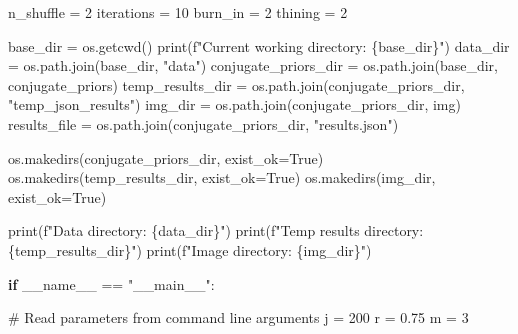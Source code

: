 \documentclass[
  letterpaper,
  DIV=11,
  numbers=noendperiod]{scrreprt}
\newenvironment{Shaded}{\begin{snugshade}}{\end{snugshade}}
\newcommand{\BuiltInTok}[1]{\textcolor[rgb]{0.00,0.23,0.31}{#1}}
\newcommand{\CommentTok}[1]{\textcolor[rgb]{0.37,0.37,0.37}{#1}}
\newcommand{\ControlFlowTok}[1]{\textcolor[rgb]{0.00,0.23,0.31}{\textbf{#1}}}
\newcommand{\DecValTok}[1]{\textcolor[rgb]{0.68,0.00,0.00}{#1}}
\newcommand{\FloatTok}[1]{\textcolor[rgb]{0.68,0.00,0.00}{#1}}
\newcommand{\NormalTok}[1]{\textcolor[rgb]{0.00,0.23,0.31}{#1}}
\newcommand{\OperatorTok}[1]{\textcolor[rgb]{0.37,0.37,0.37}{#1}}
\newcommand{\SpecialCharTok}[1]{\textcolor[rgb]{0.37,0.37,0.37}{#1}}
\newcommand{\SpecialStringTok}[1]{\textcolor[rgb]{0.13,0.47,0.30}{#1}}
\newcommand{\StringTok}[1]{\textcolor[rgb]{0.13,0.47,0.30}{#1}}
\newcommand{\VariableTok}[1]{\textcolor[rgb]{0.07,0.07,0.07}{#1}}
\begin{document}
\begin{Shaded}
\begin{Highlighting}[]
\NormalTok{n\_shuffle }\OperatorTok{=} \DecValTok{2}
\NormalTok{iterations }\OperatorTok{=} \DecValTok{10}
\NormalTok{burn\_in }\OperatorTok{=} \DecValTok{2}
\NormalTok{thining }\OperatorTok{=} \DecValTok{2}

\NormalTok{base\_dir }\OperatorTok{=}\NormalTok{ os.getcwd()}
\BuiltInTok{print}\NormalTok{(}\SpecialStringTok{f"Current working directory: }\SpecialCharTok{\{}\NormalTok{base\_dir}\SpecialCharTok{\}}\SpecialStringTok{"}\NormalTok{)}
\NormalTok{data\_dir }\OperatorTok{=}\NormalTok{ os.path.join(base\_dir, }\StringTok{"data"}\NormalTok{)}
\NormalTok{conjugate\_priors\_dir }\OperatorTok{=}\NormalTok{ os.path.join(base\_dir, }\StringTok{\textquotesingle{}conjugate\_priors\textquotesingle{}}\NormalTok{)}
\NormalTok{temp\_results\_dir }\OperatorTok{=}\NormalTok{ os.path.join(conjugate\_priors\_dir, }\StringTok{"temp\_json\_results"}\NormalTok{)}
\NormalTok{img\_dir }\OperatorTok{=}\NormalTok{ os.path.join(conjugate\_priors\_dir, }\StringTok{\textquotesingle{}img\textquotesingle{}}\NormalTok{)}
\NormalTok{results\_file }\OperatorTok{=}\NormalTok{ os.path.join(conjugate\_priors\_dir, }\StringTok{"results.json"}\NormalTok{)}

\NormalTok{os.makedirs(conjugate\_priors\_dir, exist\_ok}\OperatorTok{=}\VariableTok{True}\NormalTok{)}
\NormalTok{os.makedirs(temp\_results\_dir, exist\_ok}\OperatorTok{=}\VariableTok{True}\NormalTok{)}
\NormalTok{os.makedirs(img\_dir, exist\_ok}\OperatorTok{=}\VariableTok{True}\NormalTok{)}

\BuiltInTok{print}\NormalTok{(}\SpecialStringTok{f"Data directory: }\SpecialCharTok{\{}\NormalTok{data\_dir}\SpecialCharTok{\}}\SpecialStringTok{"}\NormalTok{)}
\BuiltInTok{print}\NormalTok{(}\SpecialStringTok{f"Temp results directory: }\SpecialCharTok{\{}\NormalTok{temp\_results\_dir}\SpecialCharTok{\}}\SpecialStringTok{"}\NormalTok{)}
\BuiltInTok{print}\NormalTok{(}\SpecialStringTok{f"Image directory: }\SpecialCharTok{\{}\NormalTok{img\_dir}\SpecialCharTok{\}}\SpecialStringTok{"}\NormalTok{)}

\ControlFlowTok{if} \VariableTok{\_\_name\_\_} \OperatorTok{==} \StringTok{"\_\_main\_\_"}\NormalTok{:}

    \CommentTok{\# Read parameters from command line arguments}
\NormalTok{    j }\OperatorTok{=} \DecValTok{200}
\NormalTok{    r }\OperatorTok{=} \FloatTok{0.75}
\NormalTok{    m }\OperatorTok{=} \DecValTok{3}


\end{Highlighting}
\end{Shaded}
\end{document}
